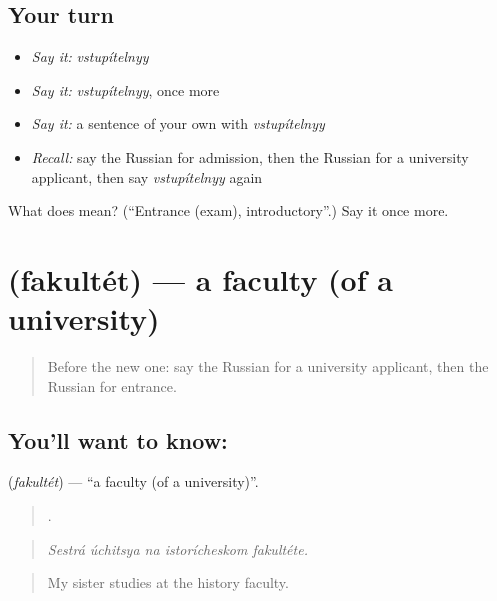 \subsection*{Your turn}
\begin{itemize}
\raggedright
  \item \emph{Say it:} \emph{vstupítelnyy}
  \item \emph{Say it:} \emph{vstupítelnyy}, once more
  \item \emph{Say it:} a sentence of your own with \emph{vstupítelnyy}
  \item \emph{Recall:} say the Russian for admission, then the Russian for a university applicant, then say \emph{vstupítelnyy} again
\end{itemize}

\begin{tcolorbox}[breakable,colback=teal!4,colframe=teal!35!black,title={Before you move on}]
What does  mean? (\textquotedblleft{}Entrance (exam), introductory\textquotedblright{}.) Say it once more.
\end{tcolorbox}
\section[\texorpdfstring{\ru{факультет} (fakultét)}{факультет (fakultét)}]{ (fakultét) — a faculty (of a university)}

\label{lesson:RU-C383-fakultet}



\begin{quote}
Before the new one: say the Russian for a university applicant, then the Russian for entrance.
\end{quote}

\subsection*{You'll want to know: }
\textbf{} (\emph{fakultét}) — \textquotedblleft{}a faculty (of a university)\textquotedblright{}.

\begin{quote}
    .
\end{quote}

\begin{quote}
\emph{Sestrá úchitsya na istorícheskom fakultéte.}
\end{quote}

\begin{quote}
My sister studies at the history faculty.
\end{quote}

